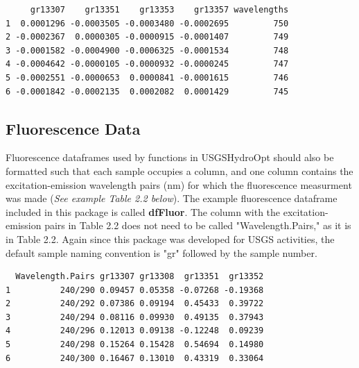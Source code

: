 \documentclass[a4paper,11pt]{article}\usepackage[]{graphicx}\usepackage[]{color}
\makeatletter
\newenvironment{kframe}{%
 \def\at@end@of@kframe{}%
 \ifinner\ifhmode%
  \def\at@end@of@kframe{\end{minipage}}%
  \begin{minipage}{\columnwidth}%
 \fi\fi%
 \def\FrameCommand##1{\hskip\@totalleftmargin \hskip-\fboxsep
 \colorbox{shadecolor}{##1}\hskip-\fboxsep
     \hskip-\linewidth \hskip-\@totalleftmargin \hskip\columnwidth}%
 \MakeFramed {\advance\hsize-\width
   \@totalleftmargin\z@ \linewidth\hsize
   \@setminipage}}%
 {\par\unskip\endMakeFramed%
 \at@end@of@kframe}
\newenvironment{knitrout}{}{} %
\makeatother
\begin{document}
\begin{knitrout}
\color{fgcolor}\begin{kframe}
\begin{verbatim}
     gr13307    gr13351    gr13353    gr13357 wavelengths
1  0.0001296 -0.0003505 -0.0003480 -0.0002695         750
2 -0.0002367  0.0000305 -0.0000915 -0.0001407         749
3 -0.0001582 -0.0004900 -0.0006325 -0.0001534         748
4 -0.0004642 -0.0000105 -0.0000932 -0.0000245         747
5 -0.0002551 -0.0000653  0.0000841 -0.0001615         746
6 -0.0001842 -0.0002135  0.0002082  0.0001429         745
\end{verbatim}
\end{kframe}
\end{knitrout}

\subsection{Fluorescence Data}
Fluorescence dataframes used by functions in USGSHydroOpt should also be formatted such that each sample occupies a column, and one column contains the excitation-emission wavelength pairs (nm) for which the fluorescence measurment was made (\emph{See example Table 2.2 below}). The example fluorescence dataframe included in this package is called \textbf{dfFluor}. The column with the excitation-emission pairs in Table 2.2 does not need to be called "Wavelength.Pairs," as it is in Table 2.2. Again since this package was developed for USGS activities, the default sample naming convention is "gr" followed by the sample number.

\begin{knitrout}
\color{fgcolor}\begin{kframe}
\begin{verbatim}
  Wavelength.Pairs gr13307 gr13308  gr13351  gr13352
1          240/290 0.09457 0.05358 -0.07268 -0.19368
2          240/292 0.07386 0.09194  0.45433  0.39722
3          240/294 0.08116 0.09930  0.49135  0.37943
4          240/296 0.12013 0.09138 -0.12248  0.09239
5          240/298 0.15264 0.15428  0.54694  0.14980
6          240/300 0.16467 0.13010  0.43319  0.33064
\end{verbatim}
\end{kframe}
\end{knitrout}
\end{document}

